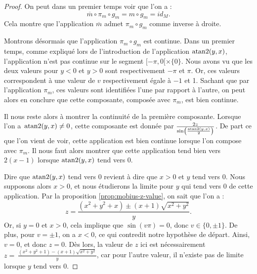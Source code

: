 \documentclass[hidelinks, 10pt]{article}
\begin{document}
\begin{proof}
On peut dans un premier temps voir que l'on a : \[\overline{m}\circ\pi_m\circ g_m=m\circ g_m=id_M.\]Cela montre que l'application $\overline{m}$ admet $\pi_m\circ g_m$ comme inverse à droite. 

\bigskip Montrons désormais que l'application $\pi_m\circ g_m$ est continue. Dans un premier temps, comme expliqué lors de l'introduction de l'application $\mathrm{atan}2(y,x)$, l'application n'est pas continue sur le segment $[-\pi,0[\times\{0\}$. Nous avons vu que les deux valeurs pour $y<0$ et $y>0$ sont respectivement $-\pi$ et $\pi$. Or, ces valeurs correspondent à une valeur de $v$ respectivement égale à $-1$ et 1. Sachant que par l'application $\pi_m$, ces valeurs sont identifiées l'une par rapport à l'autre, on peut alors en conclure que cette composante, composée avec $\pi_m$, est bien continue.

\bigskip Il nous reste alors à montrer la continuité de la première composante. Lorsque l'on a~$\mathrm{atan}2(y,x)\neq 0$, cette composante est donnée par $\frac{2z}{\sin\left(\frac{\mathrm{atan}2(y,x)}{2}\right)}$. De part ce que l'on vient de voir, cette application est bien continue lorsque l'on compose avec $\pi_m$. Il nous faut alors montrer que cette application tend bien vers $2(x-1)$ lorsque $\mathrm{atan}2(y,x)$ tend vers 0.

Dire que $\mathrm{atan}2(y,x)$ tend vers 0 revient à dire que $x>0$ et $y$ tend vers 0. Nous supposons alors $x>0$, et nous étudierons la limite pour $y$ qui tend vers 0 de cette application. Par la proposition \ref{prop:mobius-z-value}, on sait que l'on a : $$z=\frac{(x^2+y^2+x)\pm(x+1)\sqrt{x^2+y^2}}{y}.$$Or, si $y=0$ et $x>0$, cela implique que $\sin(v\pi)=0$, donc $v\in\{0,\pm1\}$. De plus, pour $v=\pm1$, on a $x<0$, ce qui contredit notre hypothèse de départ. Ainsi, $v=0$, et donc $z=0$. Dès lors, la valeur de $z$ ici est nécessairement~$z=~\frac{(x^2+y^2+1)-(x+1)\sqrt{x^2+y^2}}{y}$, car pour l'autre valeur, il n'existe pas de limite lorsque $y$ tend vers 0.


\end{proof}
\end{document}
